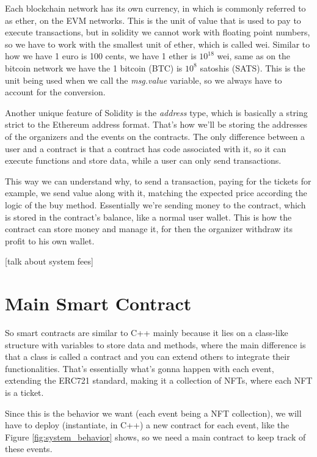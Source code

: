 Each blockchain network has its own currency, in which is commonly referred to as ether, on the EVM networks. This is the unit of value that is used to pay to execute transactions, but in solidity we cannot work with floating point numbers, so we have to work with the smallest unit of ether, which is called wei. Similar to how we have 1 euro is 100 cents, we have 1 ether is $10^{18}$ wei, same as on the bitcoin network we have the 1 bitcoin (BTC) is $10^{8}$ satoshis (SATS). This is the unit being used when we call the \textit{msg.value} variable, so we always have to account for the conversion.

Another unique feature of Solidity is the \textit{address} type, which is basically a string strict to the Ethereum address format. That's how we'll be storing the addresses of the organizers and the events on the contracts. The only difference between a user and a contract is that a contract has code associated with it, so it can execute functions and store data, while a user can only send transactions.

This way we can understand why, to send a transaction, paying for the tickets for example, we send value along with it, matching the expected price according the logic of the buy method. Essentially we're sending money to the contract, which is stored in the contract's balance, like a normal user wallet. This is how the contract can store money and manage it, for then the organizer withdraw its profit to his own wallet.

    [talk about system fees]

\section{Main Smart Contract}
\label{sec:main_smart_contract}

So smart contracts are similar to C++ mainly because it lies on a class-like structure with variables to store data and methods, where the main difference is that a class is called a contract and you can extend others to integrate their functionalities. That's essentially what's gonna happen with each event, extending the ERC721 standard, making it a collection of NFTs, where each NFT is a ticket.

Since this is the behavior we want (each event being a NFT collection), we will have to deploy (instantiate, in C++) a new contract for each event, like the Figure \ref{fig:system_behavior} shows, so we need a main contract to keep track of these events.

